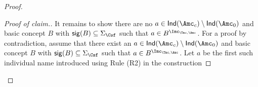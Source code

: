 \documentclass{lmcs}
\theoremstyle{definition}
\let\OriginalQedSymbol\qedsymbol
\renewcommand{\qedsymbol}{\OriginalQedSymbol\setcounter{claim}{0}}
\let\NormalQedSymbol\qedsymbol
\newenvironment{clmproof}[1]{\renewcommand{\qedsymbol}{$\dashv$}\begin{proof}[Proof of claim.]\space#1}{\end{proof}\renewcommand{\qedsymbol}{\NormalQedSymbol}}
\begin{document}
\begin{proof}
\begin{clmproof}
It remains to show there are no $a\in {\sf Ind}(\Amc_{c})\setminus{\sf Ind}(\Amc_{0})$ 
and basic concept $B$ with ${\sf sig}(B)\subseteq \Sigma_\Csf$ such 
that $a\in B^{\Imc_{\Tmc,\Amc}}$. For a proof by contradiction, assume that there exist an $a\in {\sf Ind}(\Amc_{c})\setminus{\sf Ind}(\Amc_{0})$ 
and basic concept $B$ with ${\sf sig}(B)\subseteq \Sigma_\Csf$ such that $a\in B^{\Imc_{\Tmc,\Amc}}$. 
Let $a$ be the first such individual name introduced using Rule (R2) in the construction 

\end{clmproof}
\end{proof}
\end{document}
